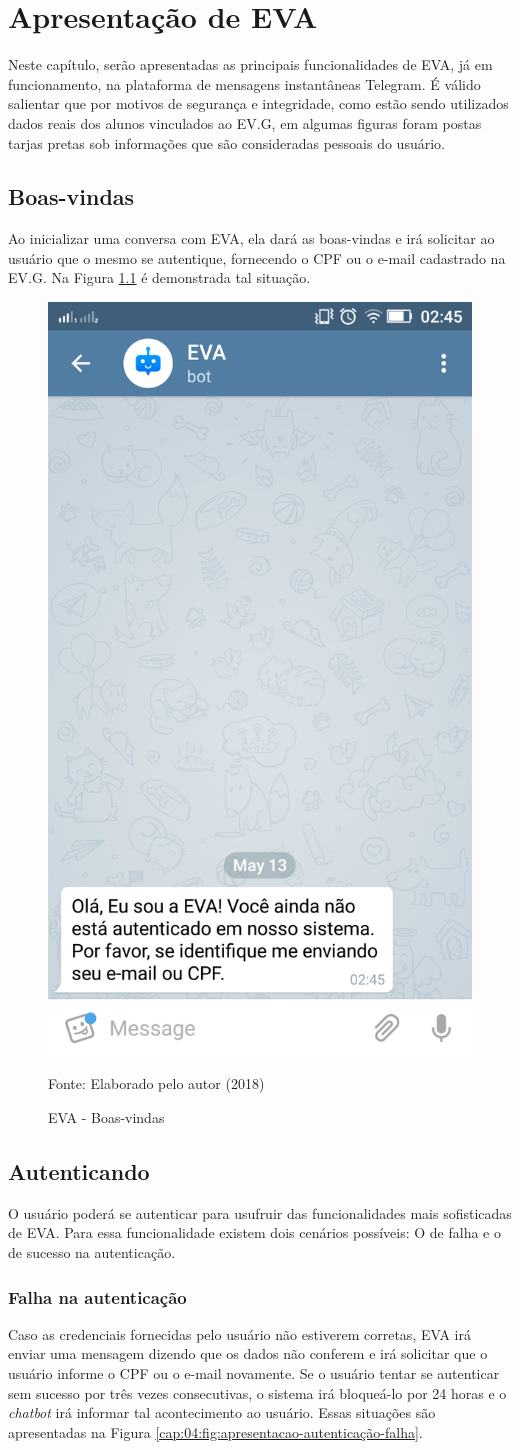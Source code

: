 \chapter{Apresentação de EVA}

Neste capítulo, serão apresentadas as principais funcionalidades de EVA, já em funcionamento, na plataforma de mensagens instantâneas Telegram. É válido salientar que por motivos de segurança e integridade, como estão sendo utilizados dados reais dos alunos vinculados ao EV.G, em algumas figuras foram postas tarjas pretas sob informações que são consideradas pessoais do usuário.

\section{Boas-vindas}

Ao inicializar uma conversa com EVA, ela dará as boas-vindas e irá solicitar ao usuário que o mesmo se autentique, fornecendo o CPF ou o e-mail cadastrado na EV.G. Na Figura \ref{cap:04:fig:apresentacao-boas-vindas} é demonstrada tal situação.

\begin{figure}[htb!]
    \centering
    \includegraphics[width=0.2\linewidth]{src/imagens/apresentacao-boas-vindas.png}
    \caption{EVA - Boas-vindas} Fonte: Elaborado pelo autor (2018)
    \label{cap:04:fig:apresentacao-boas-vindas}
\end{figure}

\section{Autenticando}
O usuário poderá se autenticar para usufruir das funcionalidades mais sofisticadas de EVA. Para essa funcionalidade existem dois cenários possíveis: O de falha e o de sucesso na autenticação.

\subsection{Falha na autenticação}
Caso as credenciais fornecidas pelo usuário não estiverem corretas, EVA irá enviar uma mensagem dizendo que os dados não conferem e irá solicitar que o usuário informe o CPF ou o e-mail novamente. Se o usuário tentar se autenticar sem sucesso por três vezes consecutivas, o sistema irá bloqueá-lo por 24 horas e o \textit{chatbot} irá informar tal acontecimento ao usuário. Essas situações são apresentadas na Figura \ref{cap:04:fig:apresentacao-autenticação-falha}.

